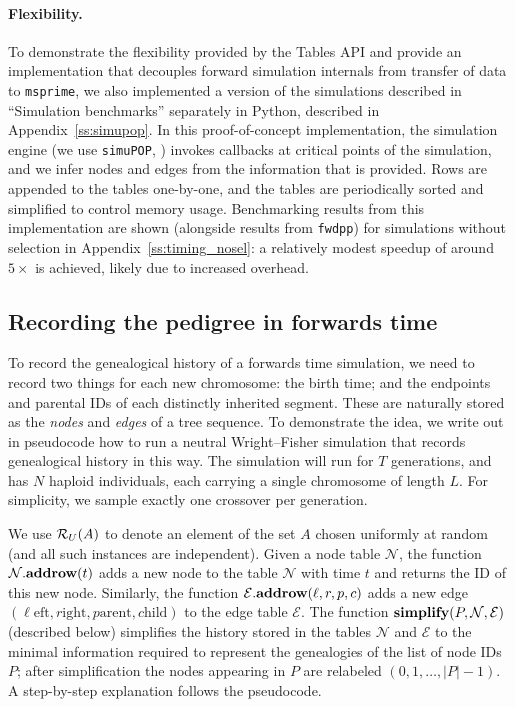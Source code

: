 \documentclass{article}
\newcommand{\simupop}{\texttt{simuPOP}}
\newcommand{\fwdpp}{\texttt{fwdpp}}
\newcommand{\msprime}{\texttt{msprime}}
\newcommand{\Nt}{\mathcal{N}}  %
\newcommand{\Et}{\mathcal{E}}  %
\newcommand{\taddrow}[2]{#1.\mbox{\textbf{addrow}}(#2)}
\newcommand{\tsimplify}[1]{\mbox{\textbf{simplify}}(#1)}
\begin{document}
\paragraph{Flexibility.}
To demonstrate the flexibility provided by the Tables API and provide an
implementation that decouples forward simulation internals from transfer of data
to \msprime, we also implemented a version of the simulations described in
``Simulation benchmarks'' separately in Python, described in Appendix~\ref{ss:simupop}.
In this proof-of-concept implementation, the simulation engine (we use \simupop{}, \citet{simupop})
invokes callbacks at critical points of the simulation, and we infer nodes and edges
from the information that is provided. Rows are appended to the tables
one-by-one, and the tables are periodically sorted and simplified to control
memory usage.
Benchmarking results from this implementation are shown (alongside results from \fwdpp{})
for simulations without selection in Appendix~\ref{ss:timing_nosel}:
a relatively modest speedup of around $5 \times$ is achieved, likely due to increased overhead.


\subsection*{Recording the pedigree in forwards time}

To record the genealogical history of a forwards time simulation,
we need to record two things for each new chromosome:
the birth time; and the endpoints and parental IDs of each distinctly inherited segment.
These are naturally stored as the \emph{nodes} and \emph{edges} of a tree sequence.
To demonstrate the idea, we write out in pseudocode how to run a neutral Wright--Fisher simulation
that records genealogical history in this way.
The simulation will run for $T$ generations,
and has $N$ haploid individuals, each carrying a single chromosome of length $L$.
For simplicity, we sample exactly one crossover per generation.

We use $\mathcal{R}_U(A)$ to denote an element of the set $A$ chosen uniformly at random
(and all such instances are independent).
Given a node table $\Nt$, the function $\taddrow{\Nt}{t}$
adds a new node to the table $\Nt$ with time $t$
and returns the ID of this new node.
Similarly, the function $\taddrow{\Et}{\ell, r, p, c}$
adds a new edge $(\ell\text{eft}, r\text{ight}, p\text{arent}, c\text{hild})$ to the edge table $\Et$.
The function $\tsimplify{P, \Nt, \Et}$ (described below) %
simplifies the history stored in the tables $\Nt$ and $\Et$
to the minimal information required to represent the genealogies of the list of node IDs $P$;
after simplification the nodes appearing in $P$ are relabeled $(0, 1, \ldots, |P|-1)$.
A step-by-step explanation follows the pseudocode.
\end{document}
